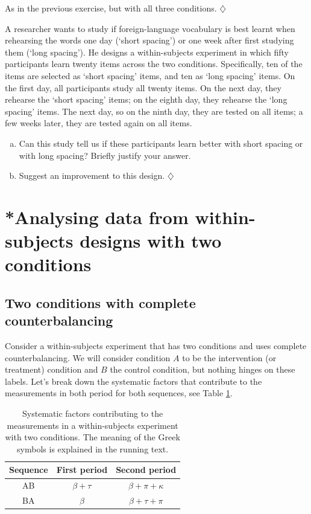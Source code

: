 \documentclass[a4paper]{tufte-book}\usepackage[]{graphicx}\usepackage[]{xcolor}
\newcommand*{\parend}[1][$\diamondsuit$]{%
  \unskip\nobreak\hspace{1em plus 1fill}$\diamondsuit$%
}
\begin{document}
As in the previous exercise, but with all three conditions.
\parend

A researcher wants to study if foreign-language vocabulary is best learnt
when rehearsing the words one day (`short spacing')
or one week after first studying them (`long spacing').
He designs a within-subjects experiment in which fifty participants
learn twenty items across the two conditions.
Specifically, ten of the items are selected as `short spacing' items,
and ten as `long spacing' items.
On the first day, all participants study all twenty items.
On the next day, they rehearse the `short spacing' items;
on the eighth day, they rehearse the `long spacing' items.
The next day, so on the ninth day, they are tested on all items;
a few weeks later, they are tested again on all items.

\begin{enumerate}[(a)]
  \item Can this study tell us if these participants learn better with short spacing or with long spacing?
        Briefly justify your answer.
        
  \item Suggest an improvement to this design. \parend
\end{enumerate}

\section{*Analysing data from within-subjects designs with two conditions}
\subsection{Two conditions with complete counterbalancing}
Consider a within-subjects experiment that has two conditions and uses
complete counterbalancing.
We will consider condition $A$ to be the intervention (or treatment) condition
and $B$ the control condition, but nothing hinges on these labels.
Let's break down the systematic factors that contribute 
to the measurements in both period for both sequences, 
see Table \ref{tab:analysiswithin}.
  
\begin{table}[h]
  \centering
  \caption{Systematic factors contributing to the measurements in a within-subjects experiment with two conditions. The meaning of the Greek symbols is explained in the running text.}
  \label{tab:analysiswithin}
  \begin{tabular}{ccc}
    \toprule 
    Sequence& First period      & Second period \\
    \midrule
    AB      & $\beta + \tau$    & $\beta + \pi + \kappa$ \\
    BA      & $\beta$           & $\beta + \tau + \pi$ \\
    \bottomrule
  \end{tabular}
\end{table}
\end{document}

